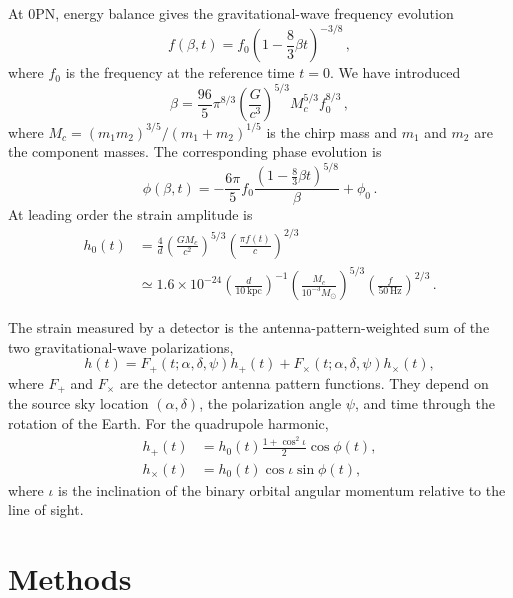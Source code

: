 \documentclass[aps,prd,amsmath,floats,floatfix, twocolumn,
superscriptaddress,nofootinbib,showpacs]{revtex4-2}
\newcommand{\bet}{\ensuremath{\frac{96}{5}\pi^{8/3}\left(\frac{G}{c^3}\right)^{5/3}M^{5/3}_cf^{8/3}_0}}
\begin{document}
At 0PN, energy balance gives the gravitational-wave frequency evolution
\begin{equation}
    f(\beta, t) = f_0 \left( 1-\frac{8}{3}\beta t \right)^{-3/8} \, , \label{eq:f}
\end{equation}
where $f_0$ is the frequency at the reference time $t=0$.  We have introduced
\begin{equation}
    \beta = \bet \, ,
\end{equation}
where $M_c = (m_1 m_2)^{3/5}/(m_1 + m_2)^{1/5}$ is the chirp mass and $m_1$ and $m_2$ are the component masses.  The corresponding phase evolution is
\begin{equation}
    \phi(\beta, t) = -\frac{6\pi}{5} f_0 \frac{(1-\frac{8}{3}\beta t)^{5/8}}{\beta} + \phi_0 \, . \label{eq:phi}
\end{equation}
At leading order the strain amplitude is
\begin{align}
h_0(t) &= \frac{4}{d} \left( \frac{G M_c}{c^2} \right)^{5/3} \left(  \frac{\pi f(t)}{c} \right)^{2/3}  \label{eq:h0} \\
& \simeq 1.6 \times 10^{-24} \left( \frac{d}{10\,\mathrm{kpc}}  \right) ^{-1} \left(  \frac{M_c}{10^{-3} M_\odot} \right) ^{5/3} \left(  \frac{f}{50\,\mathrm{Hz}} \right)^{2/3} \, .
\end{align}

The strain measured by a detector is the antenna-pattern-weighted sum of the two gravitational-wave polarizations,
\begin{equation}
    h(t) = F_+(t;\alpha,\delta,\psi) h_+(t) 
    + F_\times(t;\alpha,\delta,\psi) h_\times(t) ,
    \label{eq:detector_response}
\end{equation}
where $F_+$ and $F_\times$ are the detector antenna pattern functions.  They depend on the source sky location $(\alpha,\delta)$, the polarization angle $\psi$, and time through the rotation of the Earth.  For the quadrupole harmonic,
\begin{align}
    h_+(t) &= h_0(t) \frac{1+\cos^2\iota}{2} \cos\phi(t), \\
    h_\times(t) &= h_0(t) \cos\iota \sin\phi(t),
\end{align}
where $\iota$ is the inclination of the binary orbital angular momentum relative to the line of sight.


\section{Methods}
\label{sec:methods}
\end{document}
